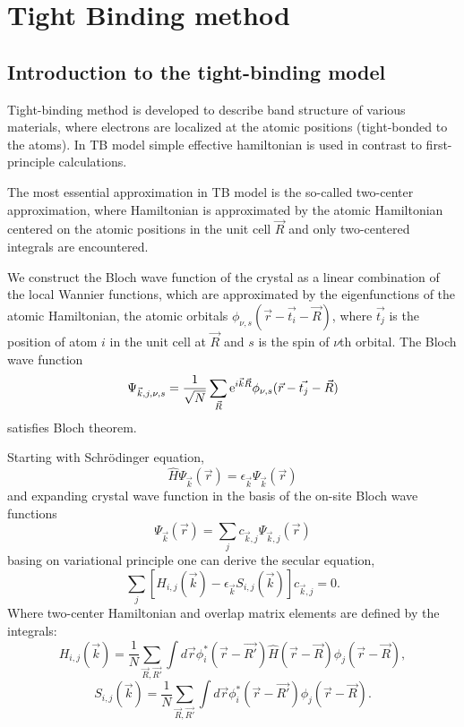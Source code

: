 \chapter{Tight Binding method}
\label{ch:theory}
\section{Introduction to the tight-binding model}
Tight-binding method is developed to describe band structure of various materials, where electrons are localized at the atomic positions (tight-bonded to the atoms). In TB model simple effective hamiltonian is used in contrast to first-principle calculations. 

The most essential approximation in TB model is the so-called two-center approximation, where Hamiltonian is approximated by the atomic Hamiltonian centered on the atomic positions in the unit cell $\vec{R}$ and only two-centered integrals are encountered.

We construct the Bloch wave function of the crystal as a linear combination of the local Wannier functions, which are approximated by the eigenfunctions of the atomic Hamiltonian, the atomic orbitals $\phi_{\nu, s}(\vec{r} - \vec{t_i} - \vec{R})$, where $\vec{t_j}$ is the position of atom $i$ in the unit cell at $\vec{R}$ and $s$ is the spin of $\nu$th orbital. The Bloch wave function
\begin{equation} \label{eq:wave_fun}
\Psi_{\vec{k}, j ,\nu, s} = \frac{1}{\sqrt{N}} \sum_{\vec{R}} \mathrm{e}^{i\vec{k}\vec{R}} \phi_{\nu, s} (\vec{r} - \vec{t_j} - \vec{R})
\end{equation}
satisfies Bloch theorem.

Starting with Schr\"{o}dinger equation,
\begin{equation}
\hat{H}\Psi_{\vec{k}}(\vec{r}) = \epsilon_{\vec{k}} \Psi_{\vec{k}}(\vec{r})
\end{equation}
and expanding crystal wave function in the basis of the on-site Bloch wave functions
\begin{equation}
\Psi_{\vec{k}}(\vec{r}) = \sum_j c_{\vec{k}, j} \Psi_{\vec{k}, j}(\vec{r})
\end{equation}
basing on variational principle one can derive the secular equation,
\begin{equation} \label{eq:secular}
\sum_j[H_{i,j}(\vec{k}) - \epsilon_{\vec{k}} S_{i, j}(\vec{k})] c_{\vec{k}, j} = 0.
\end{equation}
Where two-center Hamiltonian and overlap matrix elements are defined by the integrals:
\begin{equation} \label{eq:h_matrix}
H_{i,j}(\vec{k}) = \frac{1}{N} \sum_{\vec{R}, \vec{R'}} \int d \vec{r} \phi_i^*(\vec{r} - \vec{R'}) \hat{H}(\vec{r} - \vec{R}) \phi_j(\vec{r} - \vec{R}),
\end{equation}
\begin{equation} \label{eq:s_matrix}
S_{i,j}(\vec{k}) = \frac{1}{N} \sum_{\vec{R}, \vec{R'}} \int d \vec{r} \phi_i^*(\vec{r} - \vec{R'}) \phi_j(\vec{r} - \vec{R}).
\end{equation}

